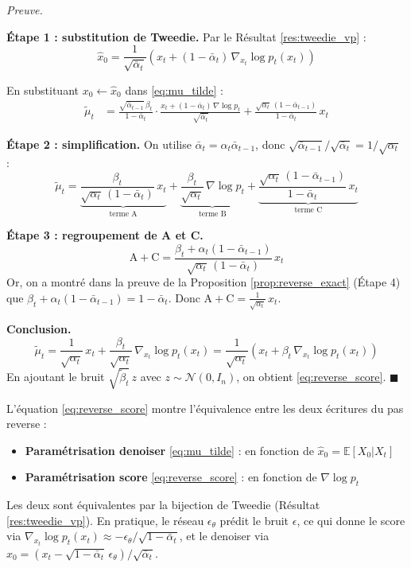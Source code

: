 \documentclass[12pt]{article}
\renewcommand{\qedsymbol}{$\blacksquare$}
\renewenvironment{proof}[1][\proofname]{%
  \par\medskip\noindent
  \textit{\color{proofgray}#1.}\enspace\ignorespaces
}{\hfill\qedsymbol\par\medskip}
\renewcommand{\proofname}{Preuve}
\begin{document}
\begin{proof}
\textbf{Étape 1 : substitution de Tweedie.} Par le Résultat \ref{res:tweedie_vp} :
\[
\hat{x}_0 = \frac{1}{\sqrt{\bar{\alpha}_t}}\left(x_t + (1-\bar{\alpha}_t)\,\nabla_{x_t} \log p_t(x_t)\right)
\]

En substituant $x_0 \leftarrow \hat{x}_0$ dans \eqref{eq:mu_tilde} :
\begin{align*}
\tilde{\mu}_t &= \frac{\sqrt{\bar{\alpha}_{t-1}}\,\beta_t}{1-\bar{\alpha}_t} \cdot \frac{x_t + (1-\bar{\alpha}_t)\, \nabla \log p_t}{\sqrt{\bar{\alpha}_t}} + \frac{\sqrt{\alpha_t}\,(1-\bar{\alpha}_{t-1})}{1-\bar{\alpha}_t}\, x_t
\end{align*}

\textbf{Étape 2 : simplification.} On utilise $\bar{\alpha}_t = \alpha_t \bar{\alpha}_{t-1}$, donc $\sqrt{\bar{\alpha}_{t-1}} / \sqrt{\bar{\alpha}_t} = 1/\sqrt{\alpha_t}$ :
\[
\tilde{\mu}_t = \underbrace{\frac{\beta_t}{\sqrt{\alpha_t}\,(1-\bar{\alpha}_t)}\,x_t}_{\text{terme A}} + \underbrace{\frac{\beta_t}{\sqrt{\alpha_t}}\,\nabla \log p_t}_{\text{terme B}} + \underbrace{\frac{\sqrt{\alpha_t}\,(1-\bar{\alpha}_{t-1})}{1-\bar{\alpha}_t}\,x_t}_{\text{terme C}}
\]

\textbf{Étape 3 : regroupement de A et C.}
\[
\text{A} + \text{C} = \frac{\beta_t + \alpha_t(1-\bar{\alpha}_{t-1})}{\sqrt{\alpha_t}\,(1-\bar{\alpha}_t)}\, x_t
\]
Or, on a montré dans la preuve de la Proposition \ref{prop:reverse_exact} (Étape 4) que $\beta_t + \alpha_t(1-\bar{\alpha}_{t-1}) = 1 - \bar{\alpha}_t$. Donc $\text{A} + \text{C} = \frac{1}{\sqrt{\alpha_t}}\, x_t$.

\textbf{Conclusion.}
\[
\tilde{\mu}_t = \frac{1}{\sqrt{\alpha_t}}\, x_t + \frac{\beta_t}{\sqrt{\alpha_t}}\, \nabla_{x_t} \log p_t(x_t) = \frac{1}{\sqrt{\alpha_t}}\left(x_t + \beta_t\, \nabla_{x_t} \log p_t(x_t)\right)
\]
En ajoutant le bruit $\sqrt{\tilde{\beta}_t}\, z$ avec $z \sim \mathcal{N}(0, I_n)$, on obtient \eqref{eq:reverse_score}.
\end{proof}

\begin{remarkbox}
L'équation \eqref{eq:reverse_score} montre l'équivalence entre les deux écritures du pas reverse :
\begin{itemize}
\item \textbf{Paramétrisation denoiser} \eqref{eq:mu_tilde} : en fonction de $\hat{x}_0 = \mathbb{E}[X_0 | X_t]$
\item \textbf{Paramétrisation score} \eqref{eq:reverse_score} : en fonction de $\nabla \log p_t$
\end{itemize}
Les deux sont équivalentes par la bijection de Tweedie (Résultat \ref{res:tweedie_vp}). En pratique, le réseau $\epsilon_\theta$ prédit le bruit $\epsilon$, ce qui donne le score via $\nabla_{x_t} \log p_t(x_t) \approx -\epsilon_\theta / \sqrt{1-\bar{\alpha}_t}$, et le denoiser via $\hat{x}_0 = (x_t - \sqrt{1-\bar{\alpha}_t}\,\epsilon_\theta)/\sqrt{\bar{\alpha}_t}$.
\end{remarkbox}
\end{document}

